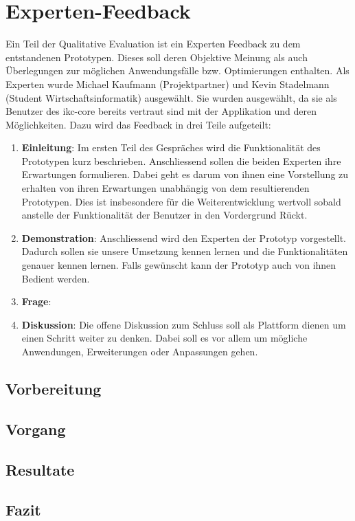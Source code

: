 \section{Experten-Feedback}
Ein Teil der Qualitative Evaluation ist ein Experten Feedback zu dem entstandenen Prototypen. Dieses soll deren Objektive Meinung als auch Überlegungen zur möglichen Anwendungsfälle bzw. Optimierungen enthalten. Als Experten wurde Michael Kaufmann (Projektpartner) und Kevin Stadelmann (Student Wirtschaftsinformatik) ausgewählt. Sie wurden ausgewählt, da sie als Benutzer des \gls{ikc-core} bereits vertraut sind mit der Applikation und deren Möglichkeiten.
Dazu wird das Feedback in drei Teile aufgeteilt:
\begin{enumerate}
    \item \textbf{Einleitung}: Im ersten Teil des Gespräches wird die Funktionalität des Prototypen kurz beschrieben. Anschliessend sollen die beiden Experten ihre Erwartungen formulieren. Dabei geht es darum von ihnen eine Vorstellung zu erhalten von ihren Erwartungen unabhängig von dem resultierenden Prototypen. Dies ist insbesondere für die Weiterentwicklung wertvoll sobald anstelle der Funktionalität der Benutzer in den Vordergrund Rückt.
    \item \textbf{Demonstration}: Anschliessend wird den Experten der Prototyp vorgestellt. Dadurch sollen sie unsere Umsetzung kennen lernen und die Funktionalitäten genauer kennen lernen. Falls gewünscht kann der Prototyp auch von ihnen Bedient werden.
    \item \textbf{Frage}:
    \item \textbf{Diskussion}: Die offene Diskussion zum Schluss soll als Plattform dienen um einen Schritt weiter zu denken. Dabei soll es vor allem um mögliche Anwendungen, Erweiterungen oder Anpassungen gehen.
\end{enumerate}
\subsection{Vorbereitung}

\subsection{Vorgang}

\subsection{Resultate}

\subsection{Fazit}

